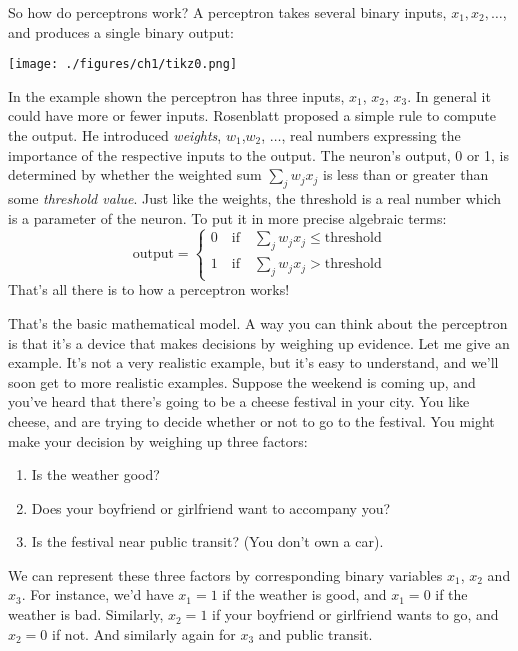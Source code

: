 \documentclass[a4paper,twoside,10pt]{book}
\begin{document}
So how do perceptrons work? A perceptron takes several binary inputs, $x_1, x_2, \ldots$,  and produces a single binary output:
\begin{center}
	\texttt{[image: ./figures/ch1/tikz0.png]}
\end{center}
In the example shown the perceptron has three inputs, $x_1$, $x_2$, $x_3$. In general it could have more or fewer inputs. Rosenblatt proposed a simple rule to compute the output. He introduced \textit{weights}, $w_1$,$w_2$, $\ldots$, real numbers expressing the importance of the respective inputs to the output. The neuron's output, 0 or 1, is determined by whether the weighted sum  $\sum_j w_jx_j$ is less than or greater than some \textit{threshold value}. Just like the weights, the threshold is a real number which is a parameter of the neuron. To put it in more precise algebraic terms:
\begin{equation}
\textrm{output} = \begin{cases}
0 \quad \textrm{if}\quad \sum_j w_jx_j \le \mathrm{threshold} \\
1 \quad \textrm{if}\quad \sum_j w_jx_j > \mathrm{threshold}\tag{1}
\end{cases}
\end{equation}
That's all there is to how a perceptron works!

That's the basic mathematical model. A way you can think about the perceptron is that it's a device that makes decisions by weighing up evidence. Let me give an example. It's not a very realistic example, but it's easy to understand, and we'll soon get to more realistic examples. Suppose the weekend is coming up, and you've heard that there's going to be a cheese festival in your city. You like cheese, and are trying to decide whether or not to go to the festival. You might make your decision by weighing up three factors:
\begin{enumerate}
	\item Is the weather good?
	\item Does your boyfriend or girlfriend want to accompany you?
	\item Is the festival near public transit? (You don't own a car).
\end{enumerate}
We can represent these three factors by corresponding binary variables $x_1$, $x_2$ and $x_3$. For instance, we'd have $x_1=1$ if the weather is good, and $x_1=0$ if the weather is bad. Similarly, $x_2=1$ if your boyfriend or girlfriend wants to go, and $x_2=0$ if not. And similarly again for $x_3$ and public transit.
\end{document}
